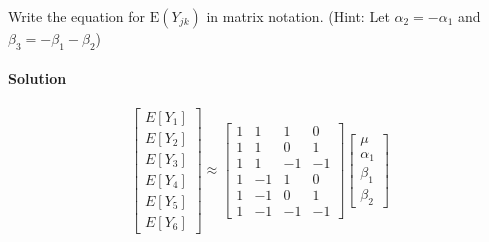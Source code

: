 \documentclass[]{article}
\let\oldparagraph\paragraph
\renewcommand{\paragraph}[1]{\oldparagraph{#1}\mbox{}}
\begin{document}
Write the equation for \(\text{E}(Y_{jk})\) in matrix notation. (Hint:
Let \(\alpha_2 = -\alpha_1\) and \(\beta_3 = -\beta_1 - \beta_2\))

\paragraph{Solution}\label{solution-3}

\[\begin{bmatrix}
E[Y_1]\\E[Y_2]\\E[Y_3]\\E[Y_4]\\E[Y_5]\\E[Y_6]
\end{bmatrix} \approx \begin{bmatrix}
1 & 1 & 1 & 0 \\
1 & 1 & 0 & 1 \\ 
1 & 1 & -1 & -1\\
1 & -1 & 1 & 0 \\
1 & -1 & 0 & 1 \\
1 & -1 & -1 & -1
\end{bmatrix}\begin{bmatrix}
\mu\\
\alpha_1\\
\beta_1\\
\beta_2
\end{bmatrix}
\]
\end{document}
